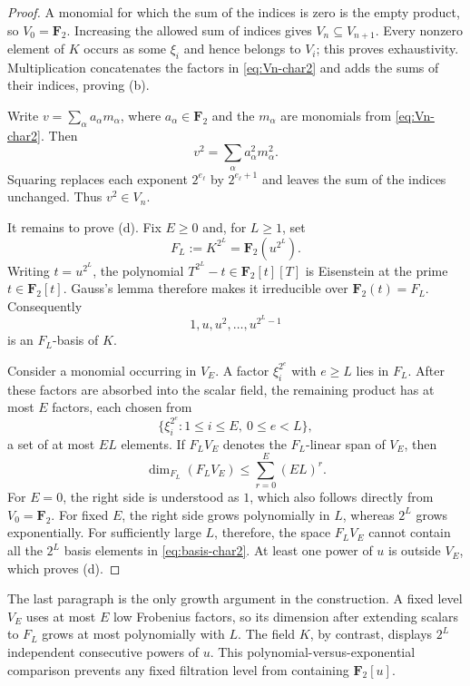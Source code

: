 \documentclass[11pt,reqno]{amsart}
\numberwithin{equation}{section}
\theoremstyle{plain}
\theoremstyle{definition}
\theoremstyle{remark}
\newcommand{\F}{\mathbf F}
\begin{document}
\begin{proof}
A monomial for which the sum of the indices is zero is the empty product, so
$V_0=\F_2$.  Increasing the allowed sum of indices gives
$V_n\subseteq V_{n+1}$.  Every nonzero element of $K$ occurs as some
$\xi_i$ and hence belongs to $V_i$; this proves exhaustivity.
Multiplication concatenates the factors in \eqref{eq:Vn-char2} and adds the
sums of their indices, proving (b).

Write $v=\sum_\alpha a_\alpha m_\alpha$, where $a_\alpha\in\F_2$ and the
$m_\alpha$ are monomials from \eqref{eq:Vn-char2}.  Then
\[
  v^2=\sum_\alpha a_\alpha^2m_\alpha^2.
\]
Squaring replaces each exponent $2^{e_\ell}$ by $2^{e_\ell+1}$ and leaves
the sum of the indices unchanged.  Thus $v^2\in V_n$.

It remains to prove (d).  Fix $E\geq0$ and, for $L\geq1$, set
\[
  F_L:=K^{2^L}=\F_2(u^{2^L}).
\]
Writing $t=u^{2^L}$, the polynomial
$T^{2^L}-t\in\F_2[t][T]$ is Eisenstein at the prime
$t\in\F_2[t]$.  Gauss's lemma therefore makes it irreducible over
$\F_2(t)=F_L$.  Consequently
\begin{equation}\label{eq:basis-char2}
  1,u,u^2,\ldots,u^{2^L-1}
\end{equation}
is an $F_L$-basis of $K$.

Consider a monomial occurring in $V_E$.  A factor $\xi_i^{2^e}$ with
$e\geq L$ lies in $F_L$.  After these factors are absorbed into the scalar
field, the remaining product has at most $E$ factors, each chosen from
\[
  \{\xi_i^{2^e}:1\leq i\leq E,\ 0\leq e<L\},
\]
a set of at most $EL$ elements.  If $F_LV_E$ denotes the $F_L$-linear span
of $V_E$, then
\begin{equation}\label{eq:dimension-char2}
  \dim_{F_L}(F_LV_E)\leq \sum_{r=0}^E(EL)^r.
\end{equation}
For $E=0$, the right side is understood as $1$, which also follows directly
from $V_0=\F_2$.  For fixed $E$, the right side grows polynomially in $L$,
whereas $2^L$ grows exponentially.  For sufficiently large $L$, therefore,
the space $F_LV_E$ cannot contain all the $2^L$ basis elements in
\eqref{eq:basis-char2}.  At least one power of $u$ is outside $V_E$, which
proves (d).
\end{proof}

The last paragraph is the only growth argument in the construction.  A
fixed level $V_E$ uses at most $E$ low Frobenius factors, so its dimension
after extending scalars to $F_L$ grows at most polynomially with $L$.  The
field $K$, by contrast, displays $2^L$ independent consecutive powers of
$u$.  This polynomial-versus-exponential comparison prevents any fixed
filtration level from containing $\F_2[u]$.
\end{document}
